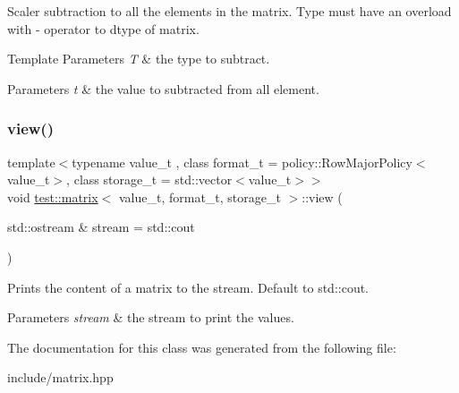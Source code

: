 Scaler subtraction to all the elements in the matrix. Type must have an overload with -\/ operator to dtype of matrix. 


\begin{DoxyTemplParams}{Template Parameters}
{\em T} & the type to subtract. \\
\hline
\end{DoxyTemplParams}

\begin{DoxyParams}{Parameters}
{\em t} & the value to subtracted from all element. \\
\hline
\end{DoxyParams}
\mbox{\label{classtest_1_1matrix_a854639ce240ca81c977aa7a1cc4be932}} 
\subsubsection{\texorpdfstring{view()}{view()}}
{\footnotesize\ttfamily template$<$typename value\+\_\+t , class format\+\_\+t  = policy\+::\+Row\+Major\+Policy$<$value\+\_\+t$>$, class storage\+\_\+t  = std\+::vector$<$value\+\_\+t$>$$>$ \\
void \mbox{\hyperlink{classtest_1_1matrix}{test\+::matrix}}$<$ value\+\_\+t, format\+\_\+t, storage\+\_\+t $>$\+::view (\begin{DoxyParamCaption}\item[{std\+::ostream \&}]{stream = {\ttfamily std\+:\+:cout} }\end{DoxyParamCaption})\hspace{0.3cm}{\ttfamily [inline]}}



Prints the content of a matrix to the stream. Default to std\+::cout. 


\begin{DoxyParams}{Parameters}
{\em stream} & the stream to print the values. \\
\hline
\end{DoxyParams}


The documentation for this class was generated from the following file\+:\begin{DoxyCompactItemize}
\item 
include/matrix.\+hpp\end{DoxyCompactItemize}
